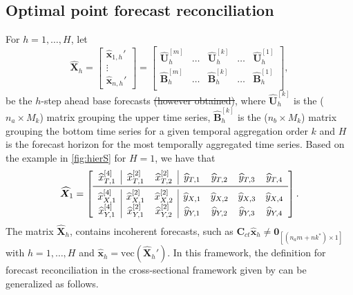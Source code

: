 \documentclass[review, 11pt]{elsarticle}
\newcommand{\xvet}{\bm{x}}
\newcommand{\Bvet}{\bm{B}}
\newcommand{\Cvet}{\bm{C}}
\newcommand{\Uvet}{\bm{U}}
\newcommand{\Xvet}{\bm{X}}
\newcommand{\Zerovet}{\bm{0}}
\theoremstyle{definition}
\begin{document}
\subsection{Optimal point forecast reconciliation}\label{ssec:oct}
For $h = 1, \dots, H$, let
$$
	\widehat{\Xvet}_{h} = \begin{bmatrix}
		\widehat{\xvet}_{1,h}' \\[-0.1cm]
		\vdots                \\[-0.2cm]
		\widehat{\xvet}_{n,h}'
	\end{bmatrix} =\begin{bmatrix}
		\widehat{\Uvet}_{h}^{[m]} & \dots & \widehat{\Uvet}_{h}^{[k]} & \dots & \widehat{\Uvet}_{h}^{[1]} \\[0.25cm]
		\widehat{\Bvet}_{h}^{[m]} & \dots & \widehat{\Bvet}_{h}^{[k]} & \dots & \widehat{\Bvet}_{h}^{[1]} \\\end{bmatrix},
$$
be the $h$-step ahead base forecasts{\color{red}\sout{ (however obtained)}}, where $\widehat{\Uvet}_{h}^{[k]}$ is the ($n_a\times M_k$) matrix grouping the upper time series, $\widehat{\Bvet}_{h}^{[k]}$ is the ($n_b\times M_k$) matrix grouping the bottom time series for a given temporal aggregation order $k$ and $H$ is the forecast horizon for the most temporally aggregated time series. Based on the example in \autoref{fig:hierS} for $H = 1$, we have that
$$
\widehat{\Xvet}_1 = \left[\begin{array}{c|cc|cccc}
\widehat{x}^{[4]}_{T,1} & \widehat{x}^{[2]}_{T,1} & \widehat{x}^{[2]}_{T,2} & \widehat{y}_{T,1} & \widehat{y}_{T,2} & \widehat{y}_{T,3} & \widehat{y}_{T,4}\\
\midrule
\widehat{x}^{[4]}_{X,1} & \widehat{x}^{[2]}_{X,1} & \widehat{x}^{[2]}_{X,2} & \widehat{y}_{X,1} & \widehat{y}_{X,2} & \widehat{y}_{X,3} & \widehat{y}_{X,4}\\
\widehat{x}^{[4]}_{Y,1} & \widehat{x}^{[2]}_{Y,1} & \widehat{x}^{[2]}_{Y,2} & \widehat{y}_{Y,1} & \widehat{y}_{Y,2} & \widehat{y}_{Y,3} & \widehat{y}_{Y,4}\\
\end{array}\right].
$$
The matrix $\widehat{\Xvet}_{h}$, %
contains incoherent forecasts, such as $\Cvet_{ct} \widehat{\xvet}_{h} \neq \Zerovet_{[(n_am+nk^\ast)\times1]}$
with $h = 1, \dots, H$ and $\widehat{\xvet}_{h} = \mathrm{vec}(\widehat{\Xvet}_{h}')$. In this framework, the definition for forecast reconciliation in the cross-sectional framework given by \cite{panagiotelis2021} can be generalized as follows.
\end{document}
